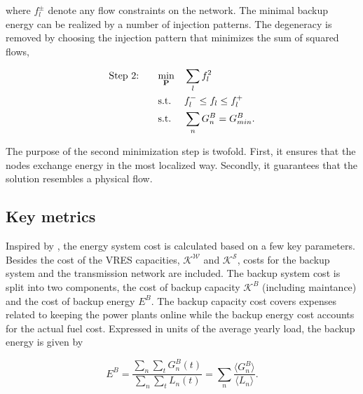 \documentclass[a4paper, 5p, sort&compress]{elsarticle}%
\begin{document}
where $f_{l}^{\pm}$ denote any flow constraints on the network.  The
minimal backup energy can be realized by a number of injection
patterns. The degeneracy is removed by choosing the injection pattern
that minimizes the sum of squared flows,

\begin{equation}
  \begin{aligned}
    \label{eq:step2}
    \text{Step 2: \hspace{15pt}} & \underset{\mathbf{P}}{\text{min}}
    & & \sum_{l} f_{l}^{2} \\
    & \text{s.t.}
    & & f_{l}^{-} \leq f_{l} \leq f_{l}^{+} \\
    & \text{s.t.}
    & & \sum_{n} G_{n}^{B} = G^{B}_{min} .
  \end{aligned}
\end{equation}

The purpose of the second minimization step is twofold. First, it
ensures that the nodes exchange energy in the most localized
way. Secondly, it guarantees that the solution resembles a physical
flow\cite{Magnus}. %

\subsection{Key metrics}

Inspired by \cite{Sensitivity}, the energy system cost is calculated
based on a few key parameters. Besides the cost of the VRES
capacities, $\mathcal{K^{W}}$ and $\mathcal{K^S}$, costs for the
backup system and the transmission network are included. The backup
system cost is split into two components, the cost of backup capacity
$\mathcal{K}^{B}$ (including maintance) and the cost of backup energy
$E^{B}$. The backup capacity cost covers expenses related to keeping
the power plants online while the backup energy cost accounts for the
actual fuel cost. Expressed in units of the average yearly load, the
backup energy is given by

\begin{equation}
  \label{eq:backup-energy}
  E^{B} =\frac{\sum_{n} \sum_{t} G^{B}_{n}(t)}{\sum_{n} \sum_{t}
    L_{n}(t)} = \sum_{n} \frac{\langle G^{B}_{n} \rangle}{\langle L_{n}
    \rangle} .
\end{equation}
\end{document}
